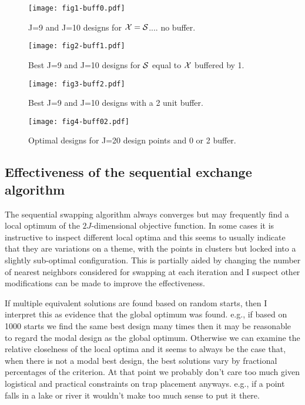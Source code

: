 \documentclass[useAMS,referee]{biom}
\begin{document}
\begin{figure}
\centering
\texttt{[image: fig1-buff0.pdf]}
\caption{J=9 and J=10 designs for 
 ${\cal X} = {\cal S}$.... no buffer.
}
\label{fig.fig1}
\end{figure}


\begin{figure}
\centering
\texttt{[image: fig2-buff1.pdf]}
\caption{
Best J=9 and J=10 designs for 
${\cal S}$ equal to 
${\cal X}$ buffered by 1.
}
\label{fig.fig2}
\end{figure}

\begin{figure}
\centering
\texttt{[image: fig3-buff2.pdf]}
\caption{
Best J=9 and J=10 designs with a 2 unit buffer.
}
\label{fig.fig3}
\end{figure}



\begin{figure}
\centering
\texttt{[image: fig4-buff02.pdf]}
\caption{
Optimal designs for J=20 design points and 0 or 2 buffer.
}
\label{fig.fig4}
\end{figure}

\subsection{Effectiveness of the sequential exchange algorithm}

The sequential swapping algorithm always converges but may frequently
find a local optimum of the $2J$-dimensional objective function. In
some cases it is instructive to inspect different local optima and
this seems to usually indicate that they are variations on a theme,
with the points in clusters but locked into a slightly sub-optimal
configuration. This is partially
aided by changing the number of nearest neighbors considered for
swapping at each iteration and I suspect other modifications can be
made to improve the effectiveness.

If multiple equivalent solutions are found based on random starts,
then I interpret this as evidence that the global optimum was
found. e.g., if based on 1000 starts we find the same best design many
times then it may be reasonable to regard the modal design as the
global optimum.  Otherwise we can examine the relative closelness
of the local optima and it seems to always be the case that, when
there is not a modal best design, 
the best solutions vary by fractional percentages of the
criterion. At that point we probably don't care too much given
logistical and practical constraints on trap placement anyways. e.g.,
if a point falls in a lake or river it wouldn't make too much sense to
put it there.
\end{document}
